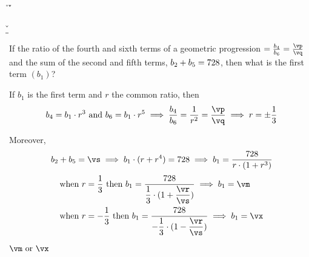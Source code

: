 

\FRACPOWER\vj{}\vp\vq
\FRACPOWER\vj{}\vr\vs

\vr\vs\p\q
{}\vr\vs\r\s
\FRACMULT\vj\vk\p\q\x\y
\FRACMULT{-\vj}\vk\r\s\v\w

\DIVIDE\vi\x\a
\MULTIPLY\a\y\vm

\DIVIDE\vi\v\b
\MULTIPLY\b\w\vx

\question[3] If the ratio of the fourth and sixth terms of a geometric progression $ = \frac{b_4}{b_6} = \frac\vp\vq$ and 
the sum of the second and fifth terms, $b_2 + b_5 = 728$, then what is the first term $(b_1)$?

\watchout

\begin{solution}[\halfpage]
  If $b_1$ is the first term and $r$ the common ratio, then 
  \[ b_4 = b_1\cdot r^3 \text{ and } b_6 = b_1\cdot r^5 \implies \dfrac{b_4}{b_6} = \dfrac{1}{r^2} 
  = \dfrac\vp\vq \implies r = \pm\dfrac\vj\vk \] 

  Moreover, 
   \[ b_2 + b_5 = \vs\implies b_1\cdot (r + r^4 ) = \vi\implies b_1 = \dfrac\vi{r\cdot (1+r^3)}\] 
	\begin{align}
    \text{when }r &= \dfrac\vj\vk\text{ then } b_1 = \dfrac\vi{\dfrac\vj\vk\cdot(1 + \dfrac\vr\vs)}
    \implies b_1 = \vm \\ 
    \text{when }r &= -\dfrac\vj\vk\text{ then } b_1 = \dfrac\vi{-\dfrac\vj\vk\cdot(1 - \dfrac\vr\vs)}
    \implies b_1 = \vx
	\end{align}
\end{solution}
\ifprintanswers\begin{codex}$\vm\text{ or }\vx$\end{codex}\fi
